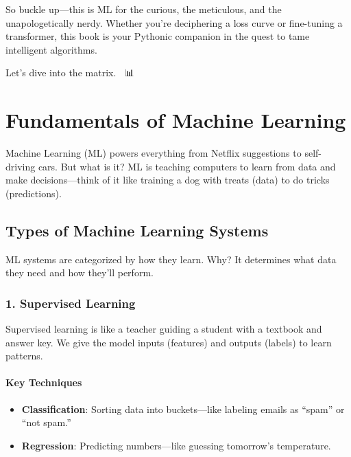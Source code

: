 \documentclass[
  letterpaper,
  DIV=11,
  numbers=noendperiod]{scrreprt}
\providecommand{\tightlist}{%
  \setlength{\itemsep}{0pt}\setlength{\parskip}{0pt}}\usepackage{longtable,booktabs,array}
\begin{document}
So buckle up---this is ML for the curious, the meticulous, and the
unapologetically nerdy. Whether you're deciphering a loss curve or
fine-tuning a transformer, this book is your Pythonic companion in the
quest to tame intelligent algorithms.

Let's dive into the matrix. 🧠🐍📊


\chapter{Fundamentals of Machine
Learning}\label{fundamentals-of-machine-learning}

Machine Learning (ML) powers everything from Netflix suggestions to
self-driving cars. But what is it? ML is teaching computers to learn
from data and make decisions---think of it like training a dog with
treats (data) to do tricks (predictions).

\section{Types of Machine Learning
Systems}\label{types-of-machine-learning-systems}

ML systems are categorized by how they learn. Why? It determines what
data they need and how they'll perform.

\subsection{1. Supervised Learning}\label{supervised-learning}

Supervised learning is like a teacher guiding a student with a textbook
and answer key. We give the model inputs (features) and outputs (labels)
to learn patterns.

\subsubsection{Key Techniques}\label{key-techniques}

\begin{itemize}
\tightlist
\item
  \textbf{Classification}: Sorting data into buckets---like labeling
  emails as ``spam'' or ``not spam.''
\item
  \textbf{Regression}: Predicting numbers---like guessing tomorrow's
  temperature.
\end{itemize}
\end{document}
